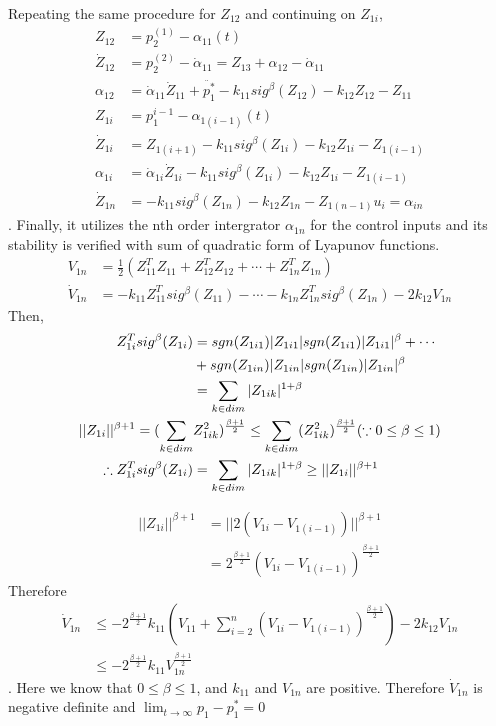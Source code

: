  Repeating the same procedure for $Z_{12}$ and continuing on $Z_{1i}$,
 \begin{align*} 
    Z_{12} &= p_2^{(1)} - \alpha_{11} (t)\\
    \dot Z_{12} &= p_2^{(2)} - \dot \alpha_{11}  = Z_{13} + \alpha_{12} - \dot \alpha_{11}\\
    \alpha_{12} &= \dot \alpha_{11} \dot Z_{11} + \ddot{p_1^*} - k_{11} sig^{\beta}(Z_{12}) - k_{12} Z_{12} - Z_{11}\\
    Z_{1i} &= p_1^{i-1} - \alpha_{1(i-1)} (t)\\
    \dot Z_{1i} &= Z_{1(i+1)} - k_{11} sig^{\beta}(Z_{1i}) - k_{12} Z_{1i} - Z_{1(i-1)}\\
    \alpha_{1i} &=  \dot \alpha_{1i} \dot Z_{1i} - k_{11} sig^{\beta}(Z_{1i}) - k_{12} Z_{1i} - Z_{1(i-1)} \\
    \dot Z_{1n} &= - k_{11} sig^{\beta}(Z_{1n}) - k_{12} Z_{1n} - Z_{1(n-1)}
    u_i = \alpha_{in}
 \end{align*}.
 Finally, it utilizes the nth order intergrator $\alpha_{1n}$ for the control inputs and its stability is verified with sum of quadratic form of Lyapunov functions. 
 \begin{align*}
    V_{1n} &= \frac{1}{2} (Z_{11}^TZ_{11} + Z_{12}^TZ_{12} + \cdots + Z_{1n}^TZ_{1n})\\
    \dot V_{1n} &= -k_{11}Z_{11}^T sig^{\beta}(Z_{11}) - \cdots -k_{1n}Z_{1n}^T sig^{\beta}(Z_{1n}) - 2k_{12}V_{1n}
 \end{align*}
 Then, 
 \begin{align*}
    Z_{1i}^T sig^{\beta}(Z_{1i}) &= sgn(Z_{1i1})|Z_{1i1}| sgn(Z_{1i1})|Z_{1i1}|^{\beta} + \cdots \bigskip\\
    &+ sgn(Z_{1in})|Z_{1in}| sgn(Z_{1in})|Z_{1in}|^{\beta}\\
    &=\sum_{k \in dim}|Z_{1ik}| ^{1+\beta} \\
    ||Z_{1i}||^{\beta +1} = (\sum_{k \in dim}&Z_{1ik} ^{2})^{\frac{\beta +1}{2}} \leq \sum_{k \in dim}(Z_{1ik} ^{2})^{\frac{\beta +1}{2}} (\because 0 \leq \beta \leq 1)\\
    \therefore Z_{1i}^T sig^{\beta}(Z_{1i}) & = \sum_{k \in dim}|Z_{1ik}| ^{1+\beta}   \geq ||Z_{1i}||^{\beta +1}
 \end{align*}
 
 \begin{align*}
    ||Z_{1i}||^{\beta +1} &= ||2(V_{1i} - V_{1(i-1)})||^{\beta + 1}\\
    &=2^{\frac{\beta + 1}{2}} (V_{1i} - V_{1(i-1)})^{\frac{\beta + 1}{2}}
 \end{align*}
    Therefore
\begin{align*}
    \dot V_{1n} &\leq - 2^{\frac{\beta + 1}{2}} k_{11}( V_{11} + \sum_{i = 2}^{n}  (V_{1i} - V_{1(i-1)})^{\frac{\beta + 1}{2}} )- 2k_{12}V_{1n}\\
    &\leq - 2^{\frac{\beta + 1}{2}} k_{11}  V_{1n}^{\frac{\beta + 1}{2}}
\end{align*}.
Here we know that $0 \leq \beta \leq 1$, and $k_{11}$ and $V_{1n}$ are positive. Therefore $\dot V_{1n}$ is negative definite and $\lim_{t\rightarrow \infty} p_1 - p_1^* = 0$
